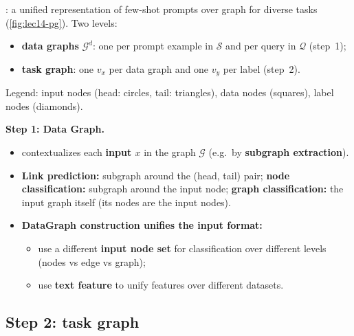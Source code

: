 \begin{definition}\label{def:lec14-pg}
  : a unified representation of few-shot prompts over graph for diverse
  tasks (\cref{fig:lec14-pg}). Two levels:
  \begin{itemize}
    \item \textbf{data graphs} $\mathcal{G}^d$: one per prompt example in $\mathcal{S}$
      and per query in $\mathcal{Q}$ (step~1);
    \item \textbf{task graph}: one  $v_x$ per data graph and one
       $v_y$ per label (step~2).
  \end{itemize}
  Legend: input nodes (head: circles, tail: triangles), data nodes (squares), label nodes
  (diamonds).
\end{definition}
\textbf{Step 1: Data Graph.}
\begin{itemize}
  \item {} contextualizes each \textbf{input $x$} in the graph
    $\mathcal{G}$ (e.g.\ by \textbf{subgraph extraction}).
  \item \textbf{Link prediction:} subgraph around the (head, tail) pair;
    \textbf{node classification:} subgraph around the input node; \textbf{graph
    classification:} the input graph itself (its nodes are the input nodes).
  \item \textbf{DataGraph construction unifies the input format:}
    \begin{itemize}
      \item use a different \textbf{input node set} for classification over different
        levels (nodes vs edge vs graph);
      \item use \textbf{text feature} to unify features over different datasets.
    \end{itemize}
\end{itemize}

\subsection{Step 2: task graph}\label{sec:lec14-tg}

